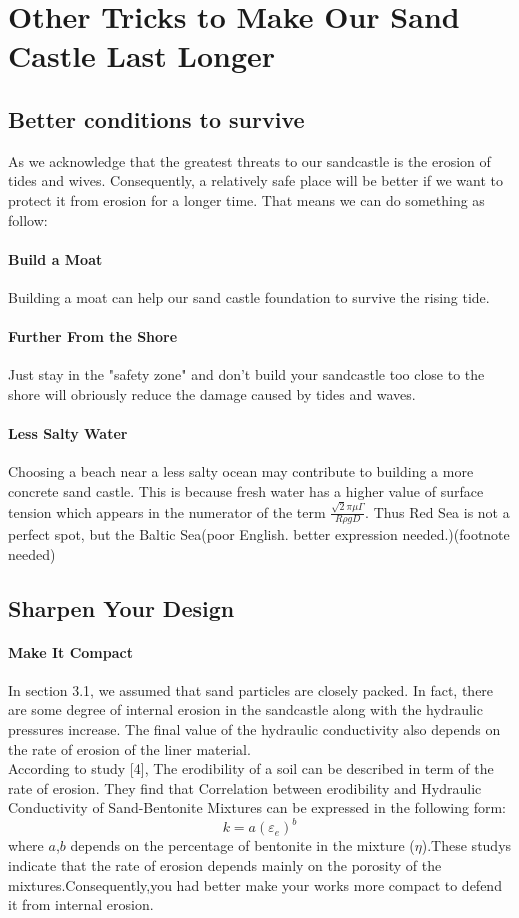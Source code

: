 \documentclass[12pt]{article}
\begin{document}
\section{Other Tricks to Make Our Sand Castle Last Longer}
\subsection{Better conditions to survive}
As we acknowledge that the greatest threats to our sandcastle is the erosion of tides and wives. Consequently, a relatively safe place will be better if we want to protect it from erosion for a longer time. That means we can do something as follow:
\paragraph{Build a Moat}
Building a moat can help our sand castle foundation to survive the rising tide.
\paragraph{Further From the Shore}
Just stay in the "safety zone" and don't build your sandcastle too close to the shore will obriously reduce the damage caused by tides and waves.
\paragraph{Less Salty Water}
Choosing a beach near a less salty ocean may contribute to building a more concrete sand castle. This is because fresh water has a higher value of surface tension which appears in the numerator of the term $\frac{\sqrt{2}\pi\mu\Gamma}{R\rho gD}$. Thus Red Sea is not a perfect spot, but the Baltic Sea(poor English. better expression needed.)(footnote needed)
\subsection{Sharpen Your Design}
\paragraph{Make It Compact}
In section 3.1, we assumed that sand particles are closely packed. In fact, there are some degree of internal erosion in the sandcastle along with the hydraulic pressures increase. The final value of the hydraulic conductivity also depends on the rate of erosion of the liner material.\\
According to study [4], The erodibility of a soil can be described in term of the rate of erosion. They find that Correlation between erodibility and Hydraulic Conductivity of Sand-Bentonite Mixtures can be expressed in the following form:
$$
    k = a(\varepsilon_e)^b
$$
where $a$,$b$ depends on the percentage of bentonite in the mixture ($\eta$).These studys indicate that the rate of erosion depends mainly on the porosity of the mixtures.Consequently,you had better make your works more compact to defend it from internal erosion.
\end{document}
